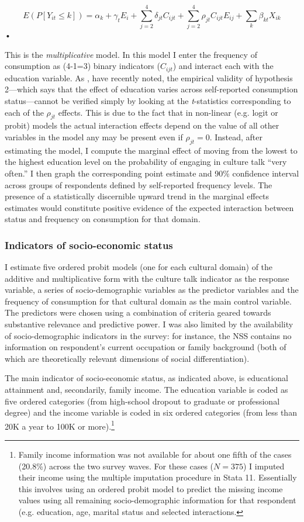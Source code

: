 \begin{equation}
E(P[Y_{it} \leq k])= \alpha_k + \gamma_t E_i + \sum_{j=2}^{4}  \delta_{jt} C_{ijt} + \sum_{j=2}^{4} \rho_{jt} C_{ijt}E_{ij} + \sum_k\beta_{kt}X_{ik}
\label{eq:eq2}
\end{equation}•

This is the \emph{multiplicative} model. In this model I enter the frequency of consumption as (4-1=3) binary indicators ($C_{ijt}$) and interact each with the education variable. As \citet{ai_norton03}, have recently noted, the empirical validity of hypothesis 2---which says that the effect of education varies across self-reported consumption status---cannot be verified simply by looking at the \emph{t}-statistics corresponding to each of the $\rho_{jt}$ effects. This is due to the fact that in non-linear (e.g. logit or probit) models the actual interaction effects depend on the value of all other variables in the model any may be present even if $\rho_{jt}=0$. Instead, after estimating the model, I compute the marginal effect of moving from the lowest to the highest education level on the probability of engaging in culture talk ``very often.''  I then graph the corresponding point estimate and 90\% confidence interval across groups of respondents defined by self-reported frequency levels.  The presence of a statistically discernible upward trend in the marginal effects estimates would constitute positive evidence of the expected interaction between status and frequency on consumption for that domain. 

\subsubsection{Indicators of socio-economic status}
I estimate five ordered probit models (one for each cultural domain) of the additive and multiplicative form with the culture talk indicator as the response variable, a series of socio-demographic variables as the predictor variables and the frequency of consumption for that cultural domain as the main control variable. The predictors were chosen  using a combination of criteria geared towards substantive relevance and predictive power. I was also limited by the availability of socio-demographic indicators in the survey: for instance, the NSS contains no information on respondent's current occupation or family background (both of which are theoretically relevant dimensions of social differentiation). 

The main indicator of socio-economic status, as indicated above, is educational attainment and, secondarily, family income.  The education variable is coded as five ordered categories (from high-school dropout to graduate or professional degree) and the income variable is coded in six ordered categories (from less than 20K a year to 100K or more).\footnote{Family income information was not available for about one fifth of the cases (20.8\%) across the two survey waves.  For these cases ($N=375$) I imputed their income using the multiple imputation procedure in Stata 11.  Essentially this involves using an ordered probit model to predict the missing income values using all remaining socio-demographic information for that respondent (e.g. education, age, marital status and selected interactions.} 

